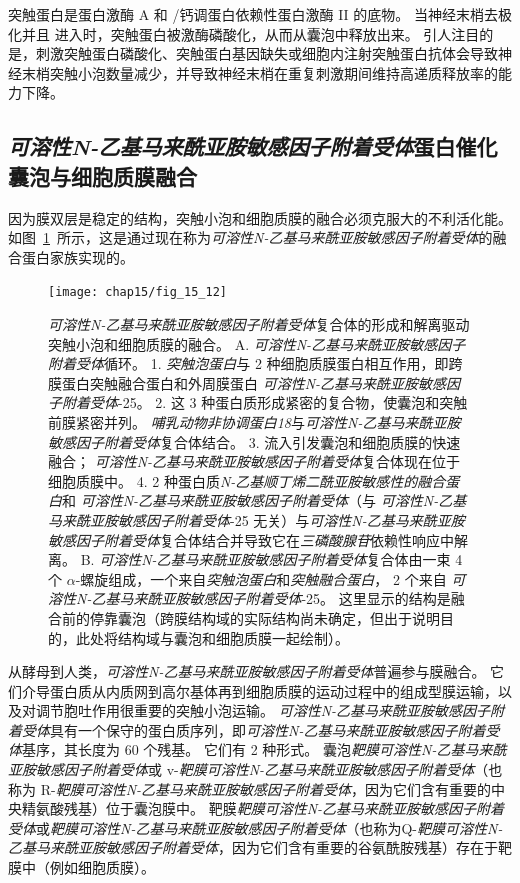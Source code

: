 突触蛋白是蛋白激酶 A 和 /钙调蛋白依赖性蛋白激酶 II 的底物。
当神经末梢去极化并且  进入时，突触蛋白被激酶磷酸化，从而从囊泡中释放出来。
引人注目的是，刺激突触蛋白磷酸化、突触蛋白基因缺失或细胞内注射突触蛋白抗体会导致神经末梢突触小泡数量减少，并导致神经末梢在重复刺激期间维持高递质释放率的能力下降。



\subsection{\textit{可溶性N-乙基马来酰亚胺敏感因子附着受体}蛋白催化囊泡与细胞质膜融合}

因为膜双层是稳定的结构，突触小泡和细胞质膜的融合必须克服大的不利活化能。
如图~\ref{fig:15_12}~所示，这是通过现在称为\textit{可溶性N-乙基马来酰亚胺敏感因子附着受体}的融合蛋白家族实现的。


\begin{figure}[htbp]
	\centering
	\texttt{[image: chap15/fig\_15\_12]}
	\caption{\textit{可溶性N-乙基马来酰亚胺敏感因子附着受体}复合体的形成和解离驱动突触小泡和细胞质膜的融合\cite{rizo2002snares}。
		 A. \textit{可溶性N-乙基马来酰亚胺敏感因子附着受体}循环。
		 1. \textit{突触泡蛋白}与 2 种细胞质膜蛋白相互作用，即跨膜蛋白突触融合蛋白和外周膜蛋白 \textit{可溶性N-乙基马来酰亚胺敏感因子附着受体}-25。
		 2. 这 3 种蛋白质形成紧密的复合物，使囊泡和突触前膜紧密并列。
		 \textit{哺乳动物非协调蛋白18}与\textit{可溶性N-乙基马来酰亚胺敏感因子附着受体}复合体结合。
		 3. 流入引发囊泡和细胞质膜的快速融合；
		 \textit{可溶性N-乙基马来酰亚胺敏感因子附着受体}复合体现在位于细胞质膜中。
		 4. 2 种蛋白质\textit{N-乙基顺丁烯二酰亚胺敏感性的融合蛋白}和 \textit{可溶性N-乙基马来酰亚胺敏感因子附着受体}（与 \textit{可溶性N-乙基马来酰亚胺敏感因子附着受体}-25 无关）与\textit{可溶性N-乙基马来酰亚胺敏感因子附着受体}复合体结合并导致它在\textit{三磷酸腺苷}依赖性响应中解离。
		 B. \textit{可溶性N-乙基马来酰亚胺敏感因子附着受体}复合体由一束 4 个 $\alpha$-螺旋组成，一个来自\textit{突触泡蛋白}和\textit{突触融合蛋白}， 2 个来自 \textit{可溶性N-乙基马来酰亚胺敏感因子附着受体}-25。
		 这里显示的结构是融合前的停靠囊泡（跨膜结构域的实际结构尚未确定，但出于说明目的，此处将结构域与囊泡和细胞质膜一起绘制）。}
	\label{fig:15_12}
\end{figure}


从酵母到人类，\textit{可溶性N-乙基马来酰亚胺敏感因子附着受体}普遍参与膜融合。
它们介导蛋白质从内质网到高尔基体再到细胞质膜的运动过程中的组成型膜运输，以及对调节胞吐作用很重要的突触小泡运输。
\textit{可溶性N-乙基马来酰亚胺敏感因子附着受体}具有一个保守的蛋白质序列，即\textit{可溶性N-乙基马来酰亚胺敏感因子附着受体}基序，其长度为 60 个残基。
它们有 2 种形式。
囊泡\textit{靶膜可溶性N-乙基马来酰亚胺敏感因子附着受体}或 v-\textit{靶膜可溶性N-乙基马来酰亚胺敏感因子附着受体}（也称为 R-\textit{靶膜可溶性N-乙基马来酰亚胺敏感因子附着受体}，因为它们含有重要的中央精氨酸残基）位于囊泡膜中。
靶膜\textit{靶膜可溶性N-乙基马来酰亚胺敏感因子附着受体}或\textit{靶膜可溶性N-乙基马来酰亚胺敏感因子附着受体}（也称为Q-\textit{靶膜可溶性N-乙基马来酰亚胺敏感因子附着受体}，因为它们含有重要的谷氨酰胺残基）存在于靶膜中（例如细胞质膜）。


